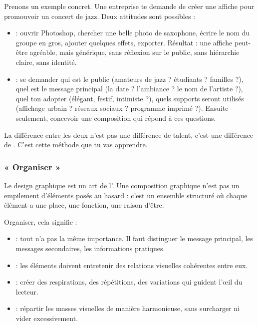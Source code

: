 Prenons un exemple concret. Une entreprise te demande de créer une affiche pour promouvoir un concert de jazz. Deux attitudes sont possibles :

\begin{itemize}
    \item {} : ouvrir Photoshop, chercher une belle photo de saxophone, écrire le nom du groupe en gros, ajouter quelques effets, exporter. Résultat : une affiche peut-être agréable, mais générique, sans réflexion sur le public, sans hiérarchie claire, sans identité.
    \item {} : se demander qui est le public (amateurs de jazz ? étudiants ? familles ?), quel est le message principal (la date ? l'ambiance ? le nom de l'artiste ?), quel ton adopter (élégant, festif, intimiste ?), quels supports seront utilisés (affichage urbain ? réseaux sociaux ? programme imprimé ?). Ensuite seulement, concevoir une composition qui répond à ces questions.
\end{itemize}

La différence entre les deux n'est pas une différence de talent, c'est une différence de . C'est cette méthode que tu vas apprendre.

\subsubsection{« Organiser »}

Le design graphique est un art de l'. Une composition graphique n'est pas un empilement d'éléments posés au hasard : c'est un ensemble structuré où chaque élément a une place, une fonction, une raison d'être.

Organiser, cela signifie :

\begin{itemize}
    \item {} : tout n'a pas la même importance. Il faut distinguer le message principal, les messages secondaires, les informations pratiques.
    \item {} : les éléments doivent entretenir des relations visuelles cohérentes entre eux.
    \item {} : créer des respirations, des répétitions, des variations qui guident l'œil du lecteur.
    \item {} : répartir les masses visuelles de manière harmonieuse, sans surcharger ni vider excessivement.
\end{itemize}

